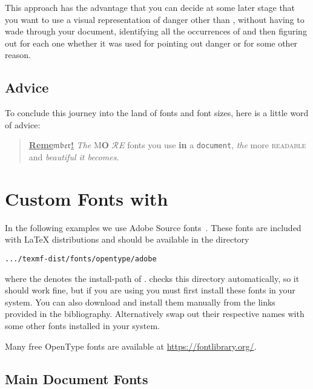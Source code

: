 This approach has the advantage that you can decide at some later
stage that you want to use a visual representation of danger other
than , without having to wade through your document,
identifying all the occurrences of  and then figuring out
for each one whether it was used for pointing out danger or for some other
reason.

\subsection{Advice}

To conclude this journey into the land of fonts and font sizes,
here is a little word of advice:\nopagebreak

\begin{quote}
  \underline{\textbf{Reme\(\mathfrak{mber}\)\Huge!}} \textit{The}
  \textsf{M\textbf{\LARGE O} \(\mathcal{R}\)\textsl{E}} fonts \Huge you
  \tiny use \footnotesize \textbf{in} a \small \texttt{document},
  \large \textit{the} \normalsize more \textsc{readable} and
  \textsl{\textsf{beautiful} it bec\large o\Large m\LARGE e\huge s}.
\end{quote}

\section{Custom Fonts with }\label{sec:fontspec}

In the following examples we use Adobe Source fonts~\cites{sourceserif,
  sourcesans, sourcecodepro}. These fonts are included with \TeXLive{} \LaTeX{}
distributions and should be available in the directory
\begin{code}
  \nolinkurl{.../texmf-dist/fonts/opentype/adobe}
\end{code}
where the  denotes the install-path of \TeXLive{}.
 checks this directory automatically, so it should work fine,
but if you are using  you must first install these fonts in your
system. You can also download and install them manually from the links provided
in the bibliography. Alternatively swap out their respective names with some other
fonts installed in your system.

Many free OpenType fonts are available at \url{https://fontlibrary.org/}.

\subsection{Main Document Fonts}

